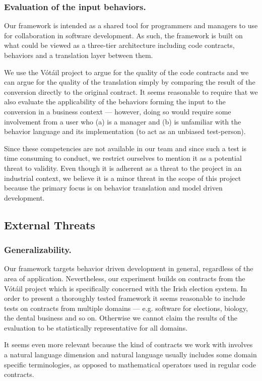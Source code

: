 \subsubsection{Evaluation of the input behaviors.}
Our framework is intended as a shared tool for programmers and managers to use for collaboration in software development.
As such, the framework is built on what could be viewed as a three-tier architecture including code contracts, behaviors and a translation layer between them.
 
We use the V\'{o}t\'{a}il project to argue for the quality of the code contracts and we can argue for the quality of the translation simply by comparing the result of the conversion directly to the original contract.
It seems reasonable to require that we also evaluate the applicability of the behaviors forming the input to the conversion in a business context --- however, doing so would require some involvement from a user who (a) is a manager and (b) is unfamiliar with the behavior language and its implementation (to act as an unbiased test-person).

Since these competencies are not available in our team and since such a test is time consuming to conduct, we restrict ourselves to mention it as a potential threat to validity.
Even though it is adherent as a threat to the project in an industrial context, we believe it is a minor threat in the scope of this project because the primary focus is on behavior translation and model driven development.

\subsection{External Threats}
\subsubsection{Generalizability.}
Our framework targets behavior driven development in general, regardless of the area of application.
Nevertheless, our experiment builds on contracts from the V\'{o}t\'{a}il project which is specifically concerned with the Irish election system.
In order to present a thoroughly tested framework it seems reasonable to include tests on contracts from multiple domains --- e.g. software for elections, biology, the dental business and so on.
Otherwise we cannot claim the results of the evaluation to be statistically representative for all domains.
 
It seems even more relevant because the kind of contracts we work with involves a natural language dimension and natural language usually includes some domain specific terminologies, as opposed to mathematical operators used in regular code contracts.
 
